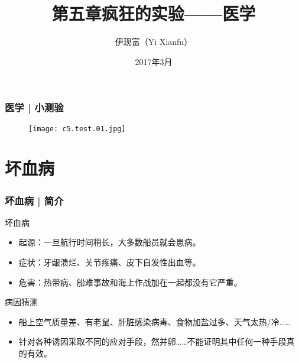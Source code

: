 



\title[医学]{第五章\quad 疯狂的实验——医学}
\author[Yixf]{伊现富（Yi Xianfu）}
\date{2017年3月}



\begin{frame}
  \frametitle{医学 | 小测验}
  \begin{figure}
    \centering
    \texttt{[image: c5.test.01.jpg]}
  \end{figure}
\end{frame}

\section{坏血病}
\begin{frame}
  \frametitle{坏血病 | 简介}
  \begin{block}{坏血病}
    \begin{itemize}
      \item 起源：一旦航行时间稍长，大多数船员就会患病。
      \item 症状：牙龈溃烂、关节疼痛、皮下自发性出血等。
      \item 危害：热带病、船难事故和海上作战加在一起都没有它严重。
    \end{itemize}
  \end{block}
  \pause
  \begin{block}{病因猜测}
    \begin{itemize}
      \item 船上空气质量差、有老鼠、肝脏感染病毒、食物加盐过多、天气太热/冷……
      \item 针对各种诱因采取不同的应对手段，然并卵……不能证明其中任何一种手段真的有效。
    \end{itemize}
  \end{block}
\end{frame}

